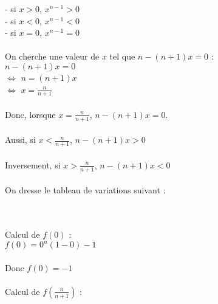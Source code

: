 \documentclass{article}
\begin{document}
\begin{exo2}
                - si $x>0$, $x^{n-1}>0$ \\
                
                - si $x<0$, $x^{n-1}<0$ \\
                
                - si $x=0$, $x^{n-1}=0$ \\ \\
                On cherche une valeur de $x$ tel que $n-(n+1)x=0$ : \\
                
                $n-(n+1)x=0$ \\
                
                $\Leftrightarrow$ $n=(n+1)x$ \\
                
                $\Leftrightarrow$ $x=\frac{n}{n+1}$ \\ \\
                Donc, lorsque $x=\frac{n}{n+1}$, $n-(n+1)x=0$. \\ \\ 
                Aussi, si $x<\frac{n}{n+1}$, $n-(n+1)x>0 $ \\ \\
                Inversement, si $x>\frac{n}{n+1}$, $n-(n+1)x<0 $ \\ \\
                On dresse le tableau de variations suivant : \\
                
                
           \\ \\           
        Calcul de $f(0)$ : \\
        
        $f(0) = 0^{n}(1-0)-1$ \\ \\
        Donc $f(0) = -1$ \\ \\
        Calcul de $f(\frac{n}{n+1})$ : \\
        

\end{exo2}
\end{document}
